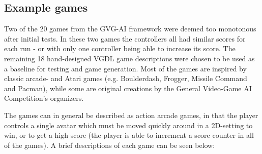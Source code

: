 \documentclass{llncs}
\begin{document}
\subsection{Example games}
\label{method:examples}
Two of the 20 games from the GVG-AI framework were deemed too monotonous after initial tests. 
In these two games the controllers all had similar scores for each run - or with only one controller being able to increase its score.
The remaining 18 hand-designed VGDL game descriptions were chosen to be used as a baseline for testing and game generation. 
Most of the games are inspired by classic arcade- and Atari games (e.g. Boulderdash, Frogger, Missile Command and Pacman), while some are original creations by the General Video-Game AI Competition's organizers. 

The games can in general be described as action arcade games, in that the player controls a single avatar which must be moved quickly around in a 2D-setting to win, or to get a high score (the player is able to increment a score  counter in all of the games).
A brief descriptions of each game can be seen below:\\
\end{document}
